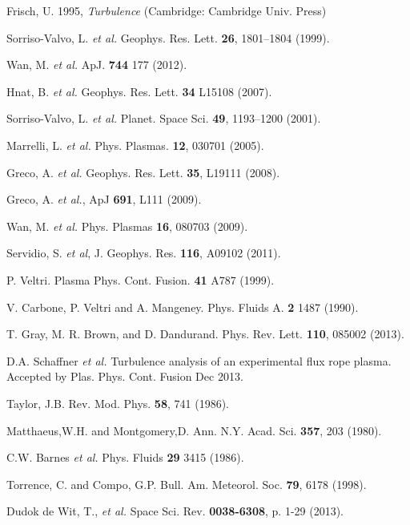 \documentclass[aps,prl,amsmath,amssymb,reprint,superscriptaddress]{revtex4-1} %
\begin{document}
\providecommand{\noopsort}[1]{}\providecommand{\singleletter}[1]{#1}%
\begin{thebibliography}{99}

Frisch, U. 1995, {\it Turbulence} (Cambridge: Cambridge Univ. Press)

Sorriso-Valvo, L. {\it et al.} Geophys. Res. Lett. {\bf 26}, 1801–1804 (1999).

Wan, M. {\it et al.} ApJ. {\bf 744} 177 (2012).

Hnat, B. {\it et al.} Geophys. Res. Lett. {\bf 34} L15108 (2007).

Sorriso-Valvo, L. {\it et al.} Planet. Space Sci. {\bf 49}, 1193–1200 (2001).

Marrelli, L. {\it et al.} Phys. Plasmas. {\bf 12}, 030701 (2005).

Greco, A. {\it et al.} Geophys. Res. Lett. {\bf 35}, L19111 (2008).

Greco, A. {\it et al.}, ApJ {\bf 691}, L111 (2009).

Wan, M. {\it et al.} Phys. Plasmas {\bf 16}, 080703 (2009).

Servidio, S. {\it et al}, J. Geophys. Res. {\bf 116}, A09102 (2011).

P. Veltri. Plasma Phys. Cont. Fusion. {\bf 41} A787 (1999).

V. Carbone, P. Veltri and A. Mangeney. Phys. Fluids A. {\bf 2} 1487 (1990).

T. Gray, M. R. Brown, and D. Dandurand. Phys. Rev. Lett. {\bf 110}, 085002 (2013). 

D.A. Schaffner {\it et al.} Turbulence analysis of an experimental flux rope plasma. Accepted by Plas. Phys. Cont. Fusion Dec 2013.

Taylor, J.B. Rev. Mod. Phys. {\bf 58}, 741 (1986).

Matthaeus,W.H. and Montgomery,D. Ann. N.Y. Acad. Sci. {\bf 357}, 203 (1980).

C.W. Barnes {\it et al.} Phys. Fluids {\bf 29} 3415 (1986).

Torrence, C. and Compo, G.P. Bull. Am. Meteorol. Soc. {\bf 79}, 6178 (1998).

Dudok de Wit, T., {\it et al.} Space Sci. Rev. {\bf 0038-6308}, p. 1-29 (2013).


\end{thebibliography}
\end{document}
